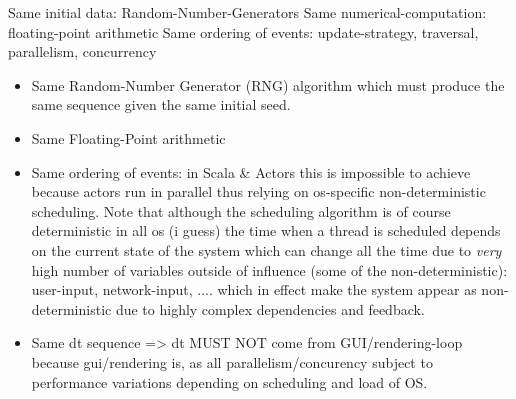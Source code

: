 Same initial data: Random-Number-Generators
Same numerical-computation: floating-point arithmetic
Same ordering of events: update-strategy, traversal, parallelism, concurrency

\begin{itemize}
\item Same Random-Number Generator (RNG) algorithm which must produce the same sequence given the same initial seed.
\item Same Floating-Point arithmetic
\item Same ordering of events: in Scala \& Actors this is impossible to achieve because actors run in parallel thus relying on os-specific non-deterministic scheduling. Note that although the scheduling algorithm is of course deterministic in all os (i guess) the time when a thread is scheduled depends on the current state of the system which can change all the time due to \textit{very} high number of variables outside of influence (some of the non-deterministic): user-input, network-input, .... which in effect make the system appear as non-deterministic due to highly complex dependencies and feedback.
\item Same dt sequence => dt MUST NOT come from GUI/rendering-loop because gui/rendering is, as all parallelism/concurency subject to performance variations depending on scheduling and load of OS.
\end{itemize}

